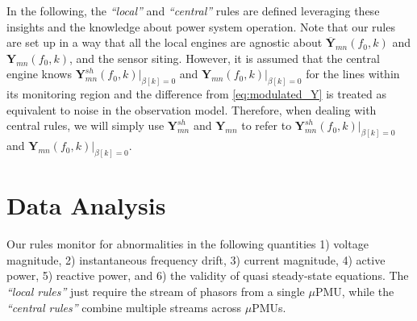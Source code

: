 \documentclass[twocolumn]{IEEEtran}
\newcommand{\mup}{\mu \text{PMU}}
\newcommand{\bs}{\boldsymbol}
\begin{document}
In the following, the \textit{``local''} and \textit{``central''} rules are defined leveraging these insights and the knowledge about power system operation.
Note that our rules are set up in a way that all the local engines are agnostic about $\overline{\bs Y}_{mn}(f_0,k)$
and $ \bs Y_{mn}(f_0,k)$, and the sensor siting. However, it is assumed that the central engine knows $\bs{Y}^{sh}_{mn}(f_0,k)|_{\beta[k]=0}$ and $\bs{Y}_{mn}(f_0,k)|_{\beta[k]=0}$ for the lines within its monitoring region and the difference from \eqref{eq:modulated_Y} is treated as equivalent to noise in the observation model. Therefore, when dealing with central rules, we will simply use $\bs{Y}^{sh}_{mn}$ and $\bs{Y}_{mn}$ to refer to
$\bs{Y}^{sh}_{mn}(f_0,k)|_{\beta[k]=0}$ and $\bs{Y}_{mn}(f_0,k)|_{\beta[k]=0}$. 

\section{Data Analysis}
\label{sec:data} 


Our rules monitor for abnormalities in the following quantities 1) voltage magnitude, 2) instantaneous frequency drift, 3) current magnitude, 4) active power, 5) reactive power, and 6) the validity of  quasi steady-state equations. 
The \textit{``local rules''} just require the stream of phasors from a single $\mup$, while the \textit{``central rules''} combine multiple streams across $\mup$s.     




%
\end{document}
